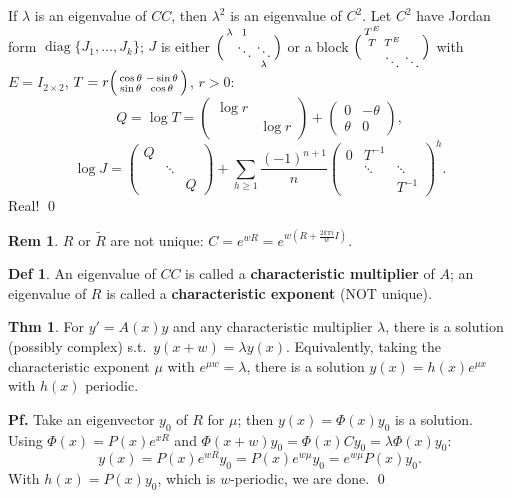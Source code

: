 \documentclass[11pt]{article}
\theoremstyle{definition}
\newtheorem*{definition}{Def}
\newtheorem*{theorem}{Thm}
\newtheorem*{remark}{Rem}
\theoremstyle{remark}
\newcommand{\diag}{\operatorname{diag}}
\begin{document}
If $\lambda$ is an eigenvalue of $CC$, then $\lambda^2$ is an eigenvalue of $C^2$. Let $C^2$ have
Jordan form $\diag\{J_1,\dots,J_k\}$; $J$ is either $\Bigl(\begin{smallmatrix}\lambda & 1 & \\ & \ddots & \ddots \\ & & \lambda\end{smallmatrix}\Bigr)$
or a block $\Bigl(\begin{smallmatrix} T^E & & \\ T & T^E & \\ & \ddots & \ddots \end{smallmatrix}\Bigr)$
with $E=I_{2\times2}$, $T=r\Bigl(\begin{smallmatrix}\cos\theta & -\sin\theta\\ \sin\theta & \cos\theta\end{smallmatrix}\Bigr)$,
$r>0$:
\[
Q=\log T=\begin{pmatrix}\log r & \\ & \log r\end{pmatrix}+\begin{pmatrix}0 & -\theta\\ \theta & 0\end{pmatrix},
\]
\[
\log J=\begin{pmatrix} Q & & \\ & \ddots & \\ & & Q \end{pmatrix}+\sum_{h\ge1}\frac{(-1)^{n+1}}{n}\begin{pmatrix} 0 & T^{-1} & \\ & \ddots & \ddots \\ & & T^{-1} \end{pmatrix}^{h}.
\]
Real! \qed

\begin{remark}
$R$ or $\widetilde{R}$ are not unique: $C=e^{wR}=e^{w(R+\frac{2k\pi i}{w}I)}$.
\end{remark}

\begin{definition}
An eigenvalue of $CC$ is called a \textbf{characteristic multiplier} of $A$; an eigenvalue of $R$ is
called a \textbf{characteristic exponent} (NOT unique).
\end{definition}

\begin{theorem}
For $y'=A(x)y$ and any characteristic multiplier $\lambda$, there is a solution (possibly complex)
s.t.\ $y(x+w)=\lambda y(x)$. Equivalently, taking the characteristic exponent $\mu$ with
$e^{\mu w}=\lambda$, there is a solution $y(x)=h(x)e^{\mu x}$ with $h(x)$ periodic.

\textbf{Pf.} Take an eigenvector $y_0$ of $R$ for $\mu$; then $y(x)=\Phi(x)y_0$ is a solution. Using
$\Phi(x)=P(x)e^{xR}$ and $\Phi(x+w)y_0=\Phi(x)Cy_0=\lambda\Phi(x)y_0$:
\[
y(x)=P(x)e^{wR}y_0=P(x)e^{w\mu}y_0=e^{w\mu}P(x)y_0.
\]
With $h(x)=P(x)y_0$, which is $w$-periodic, we are done. \qed
\end{theorem}
\end{document}
